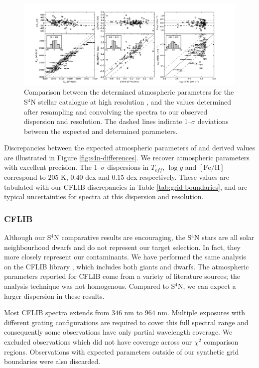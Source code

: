 \documentclass{emulateapj}
\begin{document}
\begin{figure}[t!]
	\includegraphics[width=\textwidth]{./figures/s4n-comparison.pdf}
	\caption{Comparison between the determined atmospheric parameters for the S$^{4}$N stellar catalogue at high resolution \citep{S4N}, and the values determined after resampling and convolving the spectra to our observed dispersion and resolution. The dashed lines indicate 1\---$\sigma$ deviations between the expected and determined parameters.}
	\label{fig:s4n-comparison}
\end{figure}


Discrepancies between the expected atmospheric parameters of \citet{Barklem;et-al_2004} and derived values are illustrated in Figure \ref{fig:s4n-differences}. We recover atmospheric parameters with excellent precision. The 1\---$\sigma$ dispersions in $T_{eff}$, $\log{g}$ and $[\mbox{Fe}/\mbox{H}]$ correspond to $205$ K, $0.40$ dex and $0.15$ dex respectively. These values are tabulated with our CFLIB discrepancies in Table \ref{tab:grid-boundaries}, and are typical uncertainties for spectra at this dispersion and resolution.


\subsubsection{CFLIB}
\label{sec:CFLIB}
Although our S$^4$N comparative results are encouraging, the S$^4$N stars are all solar neighbourhood dwarfs and do not represent our target selection. In fact, they more closely represent our contaminants. We have performed the same analysis on the CFLIB library \citep{Valdes;et-al_2007}, which includes both giants and dwarfs. The atmospheric parameters reported for CFLIB come from a variety of literature sources; the analysis technique was not homogenous. Compared to S$^4$N, we can expect a larger dispersion in these results.

Most CFLIB spectra extends from $346$ nm to $964$ nm. Multiple exposures with different grating configurations are required to cover this full spectral range and consequently some observations have only partial wavelength coverage. We excluded observations which did not have coverage across our $\chi^2$ comparison regions. Observations with expected parameters outside of our synthetic grid boundaries were also discarded.
\end{document}
